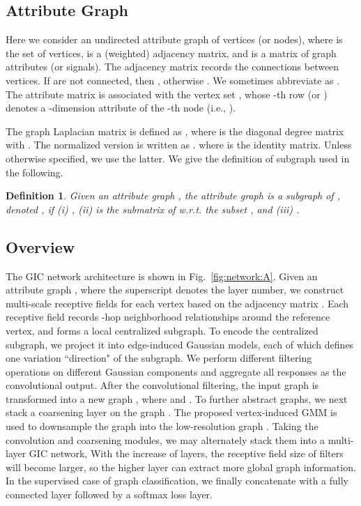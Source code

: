 \documentclass[letterpaper]{article} \usepackage{aaai19}  \usepackage{times}  \usepackage{helvet}  \usepackage{courier}  \usepackage{url}  \usepackage{graphicx}  \frenchspacing  \setlength{\pdfpagewidth}{8.5in}  \setlength{\pdfpageheight}{11in}
\def\ie{{i.e.}} \def\etal{{et.al}}
\newtheorem{defn}{Definition}
\begin{document}
\subsection{Attribute Graph}

Here we consider an undirected attribute graph  of  vertices (or nodes), where  is the set of vertices,  is a (weighted) adjacency matrix, and  is a matrix of graph attributes (or signals). The adjacency matrix  records the connections between vertices. If  are not connected, then , otherwise . We sometimes abbreviate  as . The attribute matrix  is associated with the vertex set , whose -th row  (or ) denotes a -dimension attribute of the -th node (\ie, ).

The graph Laplacian matrix  is defined as , where  is the diagonal degree matrix with . The normalized version is written as .
where  is the identity matrix. Unless otherwise specified, we use the latter. We give the definition of subgraph used in the following.
\begin{defn} \label{def:graph}
	Given an attribute graph , the attribute graph  is a subgraph of , denoted , if (i) , (ii)  is the submatrix of  w.r.t. the subset , and (iii) .
\end{defn}

\subsection{Overview}

The GIC network architecture is shown in Fig.~\ref{fig:network:A}. Given an attribute graph , where the superscript denotes the layer number, we construct multi-scale receptive fields for each vertex based on the adjacency matrix . Each receptive field records -hop neighborhood relationships around the reference vertex, and forms a local centralized subgraph. To encode the centralized subgraph, we project it into edge-induced Gaussian models, each of which defines one variation ``direction" of the subgraph. We perform different filtering operations on different Gaussian components and aggregate all responses as the convolutional output. After the convolutional filtering, the input graph  is transformed into a new graph , where  and . To further abstract graphs, we next stack a coarsening layer on the graph . The proposed vertex-induced GMM is used to downsample the graph  into the low-resolution graph . Taking the convolution and coarsening modules, we may alternately stack them into a multi-layer GIC network, With the increase of layers, the receptive field size of filters will become larger, so the higher layer can extract more global graph information. In the supervised case of graph classification, we finally concatenate with a fully connected layer followed by a softmax loss layer.
\end{document}
